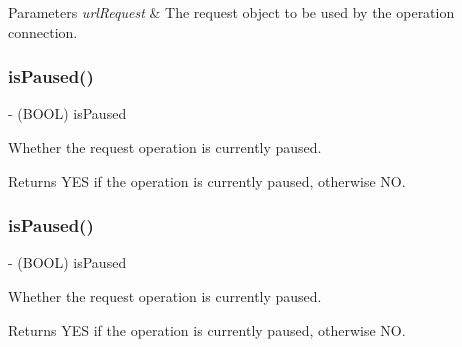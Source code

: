 \begin{DoxyParams}{Parameters}
{\em url\+Request} & The request object to be used by the operation connection. \\
\hline
\end{DoxyParams}
\mbox{\label{interface_a_f_u_r_l_connection_operation_a7fbb0a649a549bf21234c02c556c61f9}} 
\subsubsection{\texorpdfstring{is\+Paused()}{isPaused()}\hspace{0.1cm}{\footnotesize\ttfamily [1/3]}}
{\footnotesize\ttfamily -\/ (B\+O\+OL) is\+Paused \begin{DoxyParamCaption}{ }\end{DoxyParamCaption}}

Whether the request operation is currently paused.

\begin{DoxyReturn}{Returns}
{\ttfamily Y\+ES} if the operation is currently paused, otherwise {\ttfamily NO}. 
\end{DoxyReturn}
\mbox{\label{interface_a_f_u_r_l_connection_operation_a7fbb0a649a549bf21234c02c556c61f9}} 
\subsubsection{\texorpdfstring{is\+Paused()}{isPaused()}\hspace{0.1cm}{\footnotesize\ttfamily [2/3]}}
{\footnotesize\ttfamily -\/ (B\+O\+OL) is\+Paused \begin{DoxyParamCaption}{ }\end{DoxyParamCaption}}

Whether the request operation is currently paused.

\begin{DoxyReturn}{Returns}
{\ttfamily Y\+ES} if the operation is currently paused, otherwise {\ttfamily NO}. 
\end{DoxyReturn}
\mbox{\label{interface_a_f_u_r_l_connection_operation_a7fbb0a649a549bf21234c02c556c61f9}} 
